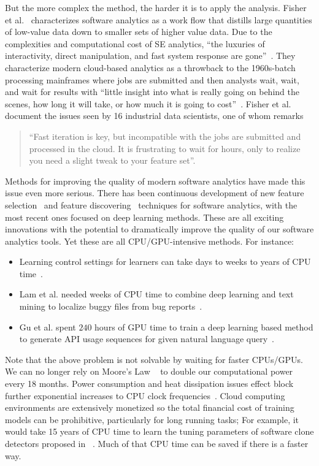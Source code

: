 \documentclass[sigconf]{acmart}
\theoremstyle{break}
\newcommand{\bi}{\begin{itemize}[leftmargin=0.4cm]}
\newcommand{\ei}{\end{itemize}}
\begin{document}
But the more complex the  method,
the harder it is to apply the analysis.
Fisher et al.~\cite{fisher2012interactions} characterizes software analytics as a work flow that distills large quantities of low-value data down to smaller sets of higher value data. Due to the complexities and computational cost of SE analytics, ``the luxuries of interactivity, direct manipulation, and fast system response are gone''~\cite{fisher2012interactions}. They characterize modern cloud-based analytics as a throwback to the 1960s-batch processing mainframes where jobs are submitted and then analysts wait, wait, and wait for results with ``little insight into what is really going on behind the scenes, how long it will take, or how much it is going to cost''~\cite{fisher2012interactions}. Fisher et al. ~\cite{fisher2012interactions} document the issues seen by 16 industrial data scientists, one of whom remarks \begin{quote}
``Fast iteration is key, but incompatible with the jobs are submitted and processed in the cloud. It is frustrating to wait for hours, only to realize you need a slight tweak to your feature set''.
\end{quote}

Methods for improving the quality of modern software analytics have made this issue even more serious. There has been continuous development of new feature selection~\cite{hall2003benchmarking} and feature discovering~\cite{jiang2013personalized} techniques for software analytics, with the most recent ones focused on deep learning methods. These are all exciting innovations with the potential to dramatically improve the quality of our software analytics tools. Yet these are all CPU/GPU-intensive methods. For instance:
\bi
\item Learning control settings for learners can take days to weeks to years of CPU time~\cite{fu2016differential,tantithamthavorn2016automated,wang2013searching}.
\item Lam et al. needed weeks of CPU time to combine deep learning and text mining to localize buggy
files from bug reports~\cite{lam2015combining}.
\item Gu et al. spent $240$ hours of GPU time  to train a deep learning based method to generate API usage sequences for given natural language query~\cite{gu2016deep}. 
\ei 
Note that the above problem is not solvable by waiting for faster CPUs/GPUs. We 
can no longer rely on Moore's Law ~\cite{moore1998cramming} to double our computational power every 18 months. Power consumption and heat dissipation issues effect block further exponential increases to CPU clock frequencies~\cite{kumar2003single}. Cloud computing environments are extensively monetized so the total financial cost of training models can be prohibitive, particularly for long running tasks; For example, it would take 15 years of CPU time to learn the tuning parameters of software clone detectors proposed in ~\cite{wang2013searching}. Much of that CPU time can be saved if there is a faster  way.
\end{document}
